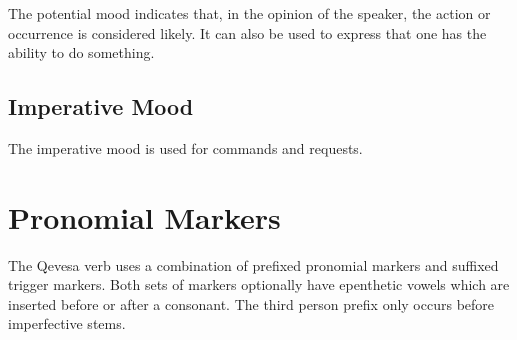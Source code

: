 \documentclass[grammar]{subfiles}
\begin{document}
The potential mood indicates that, in the opinion of the speaker, the
action or occurrence is considered likely.  It can also be used to express that
one has the ability to do something.


\subsection{Imperative Mood}
\label{ssec:vm_imperative}

The imperative mood is used for commands and requests. 

\section{Pronomial Markers}
\label{sec:vm_pronomial_markers}

The Qevesa verb uses a combination of prefixed pronomial markers and suffixed
trigger markers. Both sets of markers optionally have epenthetic vowels which
are inserted before or after a consonant.  The third person prefix  only
occurs before imperfective stems.

% 
% 
% 
\end{document}
